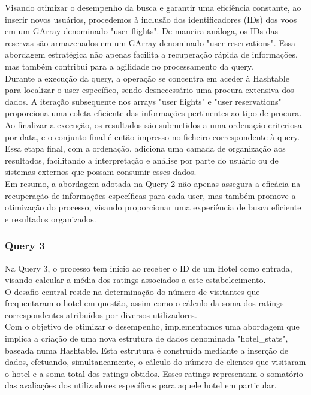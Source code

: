 \documentclass[12pt,a4paper]{article}
\begin{document}
    Visando otimizar o desempenho da busca e garantir uma eficiência constante, ao inserir novos usuários, procedemos à inclusão dos identificadores (IDs) dos voos em um GArray denominado "user flights". De maneira análoga, os IDs das reservas são armazenados em um GArray denominado "user reservations". Essa abordagem estratégica não apenas facilita a recuperação rápida de informações, mas também contribui para a agilidade no processamento da query.\\
    
    Durante a execução da query, a operação se concentra em aceder à Hashtable para localizar o user específico, sendo desnecessário uma procura extensiva dos dados. A iteração subsequente nos arrays "user flights" e "user reservations" proporciona uma coleta eficiente das informações pertinentes ao tipo de procura.\\
    
    Ao finalizar a execução, os resultados são submetidos a uma ordenação criteriosa por data, e o conjunto final é então impresso no ficheiro correspondente à query. Essa etapa final, com a ordenação, adiciona uma camada de organização aos resultados, facilitando a interpretação e análise por parte do usuário ou de sistemas externos que possam consumir esses dados.\\
    
    Em resumo, a abordagem adotada na Query 2 não apenas assegura a eficácia na recuperação de informações específicas para cada user, mas também promove a otimização do processo, visando proporcionar uma experiência de busca eficiente e resultados organizados.\\

    \subsubsection{Query 3}
    \hspace{0,6cm}Na Query 3, o processo tem início ao receber o ID de um Hotel como entrada, visando calcular a média dos ratings associados a este estabelecimento.\\

    O desafio central reside na determinação do número de visitantes que frequentaram o hotel em questão, assim como o cálculo da soma dos ratings correspondentes atribuídos por diversos utilizadores.\\

    Com o objetivo de otimizar o desempenho, implementamos uma abordagem que implica a criação de uma nova estrutura de dados denominada "hotel\_stats", baseada numa Hashtable. Esta estrutura é construída mediante a inserção de dados, efetuando, simultaneamente, o cálculo do número de clientes que visitaram o hotel e a soma total dos ratings obtidos. Esses ratings representam o somatório das avaliações dos utilizadores específicos para aquele hotel em particular.
       
\end{document}
